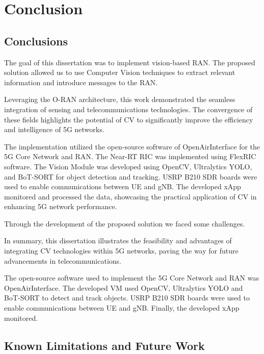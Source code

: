 \chapter{Conclusion}\label{ch:conclusion}

\section{Conclusions}\label{sec:conclusions}
The goal of this dissertation was to implement vision-based RAN\@.
The proposed solution allowed us to use Computer Vision techniques to extract relevant information and introduce messages to the RAN\@.

Leveraging the O-RAN architecture, this work demonstrated the seamless integration of sensing and telecommunications technologies.
The convergence of these fields highlights the potential of CV to significantly improve the efficiency and intelligence of 5G networks.

The implementation utilized the open-source software of OpenAirInterface for the 5G Core Network and RAN\@.
The Near-RT RIC was implemented using FlexRIC software.
The Vision Module was developed using OpenCV, Ultralytics YOLO, and BoT-SORT for object detection and tracking.
USRP B210 SDR boards were used to enable communications between UE and gNB\@.
The developed xApp monitored and processed the data, showcasing the practical application of CV in enhancing 5G network performance.

Through the development of the proposed solution we faced some challenges.

In summary, this dissertation illustrates the feasibility and advantages of integrating CV technologies within 5G networks, paving the way for future advancements in telecommunications.



The open-source software used to implement the 5G Core Network and RAN was OpenAirInterface.
The developed VM used OpenCV, Ultralytics YOLO and BoT-SORT to detect and track objects.
USRP B210 SDR boards were used to enable communications between UE and gNB\@.
Finally, the developed xApp monitored.

\section{Known Limitations and Future Work}\label{sec:fut_work}

